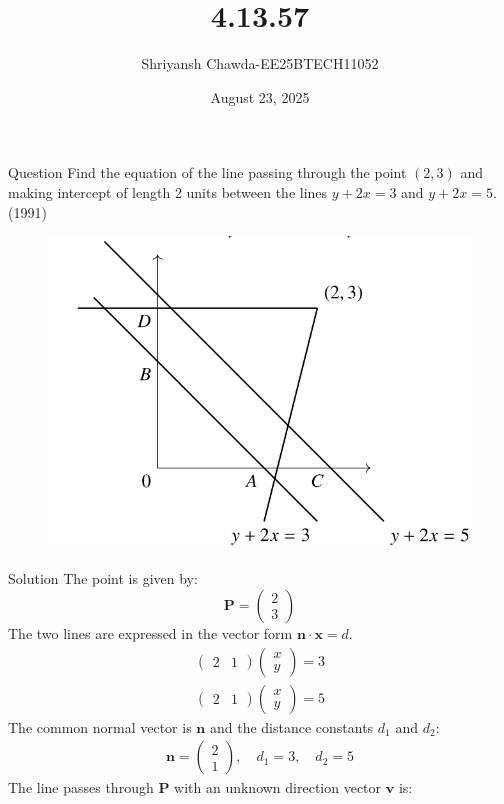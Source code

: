 \documentclass{beamer}
\title{4.13.57}
\author{Shriyansh Chawda-EE25BTECH11052}
\date{August 23, 2025}
\newcommand{\myvec}[1]{\ensuremath{\begin{pmatrix}#1\end{pmatrix}}}
\begin{document}
	

		\frame{\titlepage}
	
	
	

	\begin{frame}{Question} 
Find the equation of the line passing through the point $(2,3)$ and making intercept of length 2 units between the lines $y + 2x = 3$ and $y + 2x = 5$. 
\hfill(1991)
\begin{figure}[H]
	\centering
	\includegraphics[width=0.5\linewidth]{figs/question}
	\end{figure}
\end{frame}
	
\begin{frame}{Solution}
The point is given by:
\[ \mathbf{P} = \myvec{2 \\ 3} \]
The two lines are expressed in the vector form $\mathbf{n} \cdot \mathbf{x} = d$.
\begin{align}
	\myvec{2 & 1} \myvec{x \\ y} = 3 \\
	\myvec{2 & 1} \myvec{x \\ y} = 5
\end{align}
The common normal vector is $\mathbf{n}$ and the distance constants $d_1$ and $d_2$:
\begin{align}
	\mathbf{n} = \myvec{2 \\ 1}, \quad d_1 = 3, \quad d_2 = 5 \end{align}
	The line passes through $\mathbf{P}$ with an unknown direction vector $\mathbf{v}$ is:
\end{frame}
\end{document}

